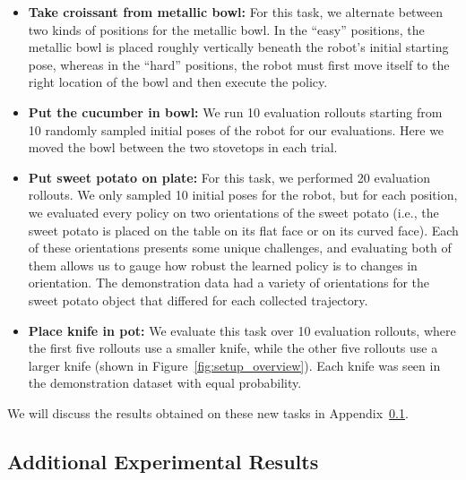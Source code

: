 \documentclass[conference]{IEEEtran}
\begin{document}
\begin{itemize}
    \item \textbf{Take croissant from metallic bowl:} For this task, we alternate between two kinds of positions for the metallic bowl. In the ``easy'' positions, the metallic bowl is placed roughly vertically beneath the robot's initial starting pose, whereas in the ``hard'' positions, the robot must first move itself to the right location of the bowl and then execute the policy.
    \item \textbf{Put the cucumber in bowl:} We run 10 evaluation rollouts starting from 10 randomly sampled initial poses of the robot for our evaluations. Here we moved the bowl between the two stovetops in each trial. 
    \item \textbf{Put sweet potato on plate:} For this task, we performed 20 evaluation rollouts. We only sampled 10 initial poses for the robot, but for each position, we evaluated every policy on two orientations of the sweet potato (i.e., the sweet potato is placed on the table on its flat face or on its curved face). Each of these orientations presents some unique challenges, and evaluating both of them allows us to gauge how robust the learned policy is to changes in orientation. The demonstration data had a variety of orientations for the sweet potato object that differed for each collected trajectory. 
    \item \textbf{Place knife in pot:} We evaluate this task over 10 evaluation rollouts, where the first five rollouts use a smaller knife, while the other five rollouts use a larger knife (shown in Figure~\ref{fig:setup_overview}). Each knife was seen in the demonstration dataset with equal probability.
\end{itemize}

We will discuss the results obtained on these new tasks in Appendix~\ref{app:exp_results}.


\subsection{Additional Experimental Results}
\label{app:exp_results}
\end{document}
